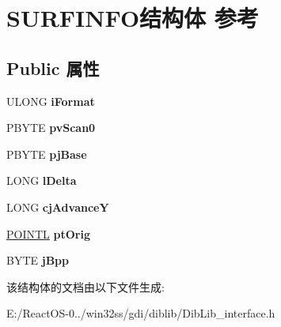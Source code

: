\hypertarget{struct_s_u_r_f_i_n_f_o}{}\section{S\+U\+R\+F\+I\+N\+F\+O结构体 参考}
\label{struct_s_u_r_f_i_n_f_o}
\subsection*{Public 属性}
\begin{DoxyCompactItemize}
\item 
\mbox{\label{struct_s_u_r_f_i_n_f_o_ae8c1384d7aa7b90922fdd9dd976f37c7}} 
U\+L\+O\+NG {\bfseries i\+Format}
\item 
\mbox{\label{struct_s_u_r_f_i_n_f_o_a8ac55c4b4500f64c0ad21469e19836b2}} 
P\+B\+Y\+TE {\bfseries pv\+Scan0}
\item 
\mbox{\label{struct_s_u_r_f_i_n_f_o_a44d017fe10f7bb1f1b5e521135920e62}} 
P\+B\+Y\+TE {\bfseries pj\+Base}
\item 
\mbox{\label{struct_s_u_r_f_i_n_f_o_a889ea05a37d399ed7684fda862bb43f7}} 
L\+O\+NG {\bfseries l\+Delta}
\item 
\mbox{\label{struct_s_u_r_f_i_n_f_o_a693304497e61882e0c29f3305d51a355}} 
L\+O\+NG {\bfseries cj\+AdvanceY}
\item 
\mbox{\label{struct_s_u_r_f_i_n_f_o_aa90c50db5eee55a8c17ef9c5aa18123c}} 
\hyperlink{struct___p_o_i_n_t_l}{P\+O\+I\+N\+TL} {\bfseries pt\+Orig}
\item 
\mbox{\label{struct_s_u_r_f_i_n_f_o_afb2b67a4e3a2c2f56f8a68f32f780c93}} 
B\+Y\+TE {\bfseries j\+Bpp}
\end{DoxyCompactItemize}


该结构体的文档由以下文件生成\+:\begin{DoxyCompactItemize}
\item 
E\+:/\+React\+O\+S-\/0../win32ss/gdi/diblib/Dib\+Lib\+\_\+interface.\+h\end{DoxyCompactItemize}
